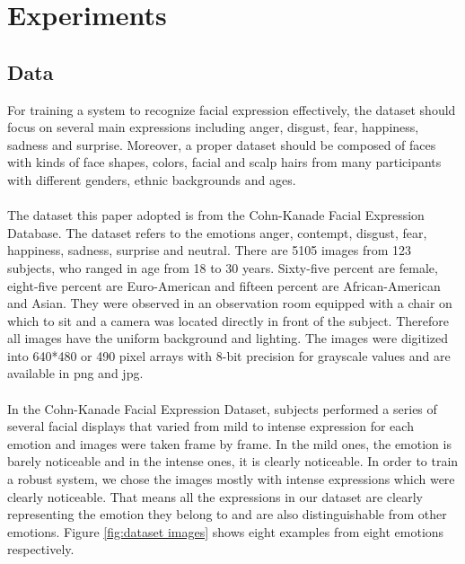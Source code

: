 \section{Experiments}\label{sec:experiments}
\nocite{Kanade2000CK+}\nocite{Lucey2010CK+}


\subsection{Data}
For training a system to recognize facial expression effectively, the dataset should focus on several main expressions including anger, disgust, fear, happiness, sadness and surprise. Moreover, a proper dataset should be composed of faces with kinds of face shapes, colors, facial and scalp hairs from many participants with different genders, ethnic backgrounds and ages.
\\
\\
The dataset this paper adopted is from the Cohn-Kanade Facial Expression Database. The dataset refers to the emotions anger, contempt, disgust, fear, happiness, sadness, surprise and neutral. There are 5105 images from 123 subjects, who ranged in age from 18 to 30 years. Sixty-five percent are female, eight-five percent are Euro-American and fifteen percent are African-American and Asian. They were observed in an observation room equipped with a chair on which to sit and a camera was located directly in front of the subject. Therefore all images have the uniform background and lighting. The images were digitized into 640*480 or 490 pixel arrays with 8-bit precision for grayscale values and are available in png and jpg.
\\
\\
In the Cohn-Kanade Facial Expression Dataset, subjects performed a series of several facial displays that varied from mild to intense expression for each emotion and images were taken frame by frame.  In the mild ones, the emotion is barely noticeable and in the intense ones, it is clearly noticeable. In order to train a robust system, we chose the images mostly with intense expressions which were clearly noticeable. That means all the expressions in our dataset are clearly representing the emotion they belong to and are also distinguishable from other emotions. Figure \ref{fig:dataset images} shows eight examples from eight emotions respectively.


